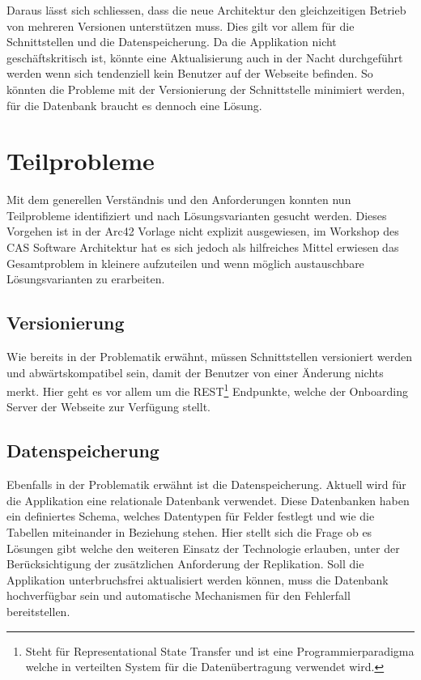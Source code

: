 Daraus lässt sich schliessen, dass die neue Architektur den gleichzeitigen Betrieb von mehreren Versionen unterstützen muss. Dies gilt vor allem für die Schnittstellen und die Datenspeicherung. Da die Applikation nicht geschäftskritisch ist, könnte eine Aktualisierung auch in der Nacht durchgeführt werden wenn sich tendenziell kein Benutzer auf der Webseite befinden. So könnten die Probleme mit der Versionierung der Schnittstelle minimiert werden, für die Datenbank braucht es dennoch eine Lösung.	

\section{Teilprobleme}

Mit dem generellen Verständnis und den Anforderungen konnten nun Teilprobleme identifiziert und nach Lösungsvarianten gesucht werden. Dieses Vorgehen ist in der Arc42 Vorlage nicht explizit ausgewiesen, im Workshop des CAS Software Architektur hat es sich jedoch als hilfreiches Mittel erwiesen das Gesamtproblem in kleinere aufzuteilen und wenn möglich austauschbare Lösungsvarianten zu erarbeiten.

\subsection{Versionierung}

Wie bereits in der Problematik erwähnt, müssen Schnittstellen versioniert werden und abwärtskompatibel sein, damit der Benutzer von einer Änderung nichts merkt. Hier geht es vor allem um die REST\footnote{Steht für Representational State Transfer und ist eine Programmierparadigma welche in verteilten System für die Datenübertragung verwendet wird.} Endpunkte, welche der Onboarding Server der Webseite zur Verfügung stellt.

\subsection{Datenspeicherung}

Ebenfalls in der Problematik erwähnt ist die Datenspeicherung. Aktuell wird für die Applikation eine relationale Datenbank verwendet. Diese Datenbanken haben ein definiertes Schema, welches Datentypen für Felder festlegt und wie die Tabellen miteinander in Beziehung stehen. Hier stellt sich die Frage ob es Lösungen gibt welche den weiteren Einsatz der Technologie erlauben, unter der Berücksichtigung der zusätzlichen Anforderung der Replikation. Soll die Applikation unterbruchsfrei aktualisiert werden können, muss die Datenbank hochverfügbar sein und automatische Mechanismen für den Fehlerfall bereitstellen.

